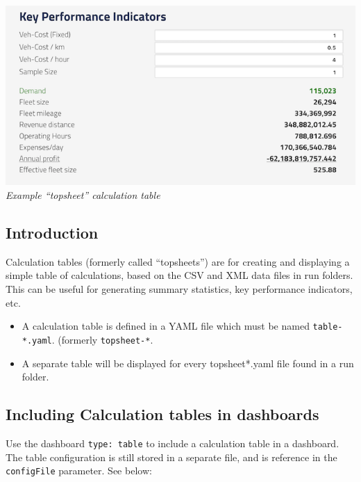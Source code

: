 \includegraphics{assets/topsheet.png} \emph{Example ``topsheet''
calculation table}

\hypertarget{introduction}{%
\subsection{Introduction}\label{introduction}}

Calculation tables (formerly called ``topsheets'') are for creating and
displaying a simple table of calculations, based on the CSV and XML data
files in run folders. This can be useful for generating summary
statistics, key performance indicators, etc.

\begin{itemize}
\tightlist
\item
  A calculation table is defined in a YAML file which must be named
  \texttt{table-*.yaml}. (formerly \texttt{topsheet-*}.
\item
  A separate table will be displayed for every topsheet*.yaml file found
  in a run folder.
\end{itemize}

\hypertarget{including-calculation-tables-in-dashboards}{%
\subsection{Including Calculation tables in
dashboards}\label{including-calculation-tables-in-dashboards}}

Use the dashboard \texttt{type:\ table} to include a calculation table
in a dashboard. The table configuration is still stored in a separate
file, and is reference in the \texttt{configFile} parameter. See below:

\begin{Shaded}
\begin{Highlighting}[]
\KeywordTok{:}
\AttributeTok{  }\KeywordTok{:}
\AttributeTok{    }\KeywordTok{{-}}\AttributeTok{ }\KeywordTok{:}
\AttributeTok{      }\KeywordTok{:}\AttributeTok{ }
\AttributeTok{      }\KeywordTok{:}\AttributeTok{ }
\AttributeTok{      }\KeywordTok{:}\AttributeTok{ }
\end{Highlighting}
\end{Shaded}

